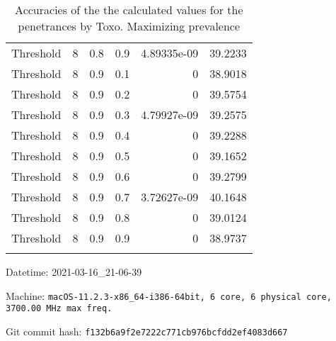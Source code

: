 \documentclass{article}
\begin{document}
\begin{longtable}[H]{lrrrrr}
 Threshold      &       8 &   0.8 &            0.9 &      4.89335e-09 &         39.2233 \\
 Threshold      &       8 &   0.9 &            0.1 &      0           &         38.9018 \\
 Threshold      &       8 &   0.9 &            0.2 &      0           &         39.5754 \\
 Threshold      &       8 &   0.9 &            0.3 &      4.79927e-09 &         39.2575 \\
 Threshold      &       8 &   0.9 &            0.4 &      0           &         39.2288 \\
 Threshold      &       8 &   0.9 &            0.5 &      0           &         39.1652 \\
 Threshold      &       8 &   0.9 &            0.6 &      0           &         39.2799 \\
 Threshold      &       8 &   0.9 &            0.7 &      3.72627e-09 &         40.1648 \\
 Threshold      &       8 &   0.9 &            0.8 &      0           &         39.0124 \\
 Threshold      &       8 &   0.9 &            0.9 &      0           &         38.9737 \\
\hline

\caption{Accuracies of the the calculated values for the penetrances by Toxo. Maximizing prevalence}
\end{longtable}
Datetime: 2021-03-16\_21-06-39

Machine: \texttt{macOS-11.2.3-x86\_64-i386-64bit, 6 core, 6 physical core, 3700.00 MHz max freq.}

Git commit hash: \texttt{f132b6a9f2e7222c771cb976bcfdd2ef4083d667}
\end{document}
